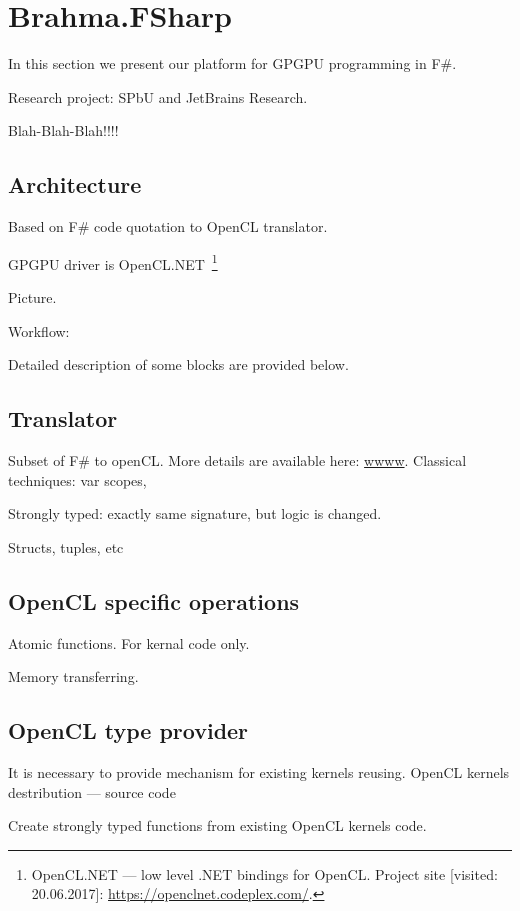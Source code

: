 \section{Brahma.FSharp}

In this section we present our platform for GPGPU programming in F\#.

Research project: SPbU and JetBrains Research.

Blah-Blah-Blah!!!!

\subsection{Architecture}

Based on F\# code quotation to OpenCL translator.

GPGPU driver is OpenCL.NET~\footnote{OpenCL.NET --- low level .NET bindings for OpenCL. Project site [visited: 20.06.2017]: \url{https://openclnet.codeplex.com/}.}

Picture.

Workflow:

Detailed description of some blocks are provided below.

\subsection{Translator}

Subset of F\# to openCL.
More details are available here: \url{wwww}.
Classical techniques: var scopes,

Strongly typed: exactly same signature, but logic is changed.

Structs, tuples, etc

\subsection{OpenCL specific operations}

Atomic functions.
For kernal code only.

Memory transferring.

\subsection{OpenCL type provider}

It is necessary to provide mechanism for existing kernels reusing.
OpenCL kernels destribution --- source code

Create strongly typed functions from existing OpenCL kernels code.